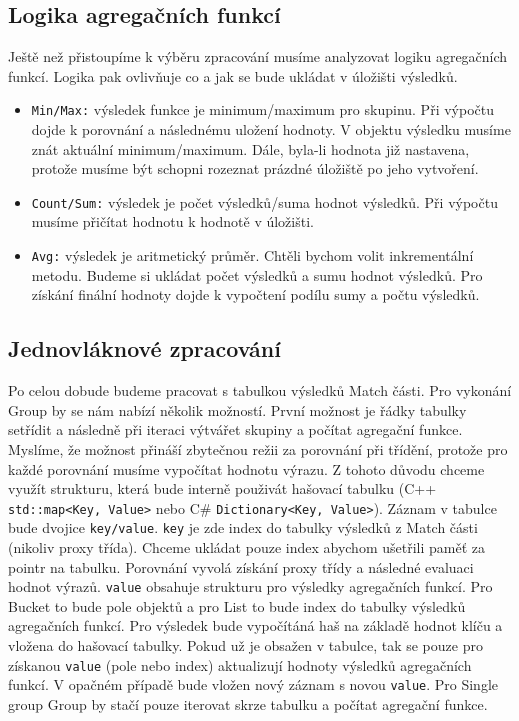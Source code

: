 \subsection{Logika agregačních funkcí}

Ještě než přistoupíme k výběru zpracování musíme analyzovat logiku agregačních funkcí.
Logika pak ovlivňuje co a jak se bude ukládat v úložišti výsledků.

\begin{itemize}
\item \texttt{Min/Max:} výsledek funkce je minimum/maximum pro skupinu. Při výpočtu dojde k porovnání a následnému uložení hodnoty.
V objektu výsledku musíme znát aktuální minimum/maximum.
Dále, byla-li hodnota již nastavena, protože musíme být schopni rozeznat prázdné úložiště po jeho vytvoření.


\item \texttt{Count/Sum:} výsledek je počet výsledků/suma hodnot výsledků. Při výpočtu musíme přičítat hodnotu k hodnotě v úložišti.
\item \texttt{Avg:} výsledek je aritmetický průměr. Chtěli bychom volit inkrementální metodu. Budeme si ukládat počet výsledků a sumu hodnot výsledků. Pro získání finální hodnoty dojde k vypočtení podílu sumy a počtu výsledků.
\end{itemize}

\subsection{Jednovláknové zpracování}

Po celou dobude budeme pracovat s tabulkou výsledků Match části.
Pro vykonání Group by se nám nabízí několik možností.
První možnost je řádky tabulky setřídit a následně při iteraci výtvářet skupiny a počítat agregační funkce.
Myslíme, že možnost přináší zbytečnou režii za porovnání při třídění, protože pro každé porovnání musíme vypočítat hodnotu výrazu.
Z tohoto důvodu chceme využít strukturu, která bude interně použivát hašovací tabulku (C++ \texttt{std::map<Key, Value>} nebo C\#  \texttt{Dictionary<Key, Value>}).
Záznam v tabulce bude dvojice \texttt{key/value}. 
\texttt{key} je zde index do tabulky výsledků z Match části (nikoliv proxy třída).
Chceme ukládat pouze index abychom ušetřili paměť za pointr na tabulku.
Porovnání vyvolá získání proxy třídy a následné evaluaci hodnot výrazů.
\texttt{value} obsahuje strukturu pro výsledky agregačních funkcí.
Pro Bucket to bude pole objektů a pro List to bude index do tabulky výsledků agregačních funkcí.
Pro výsledek bude vypočítáná haš na základě hodnot klíču a vložena do hašovací tabulky.
Pokud už je obsažen v tabulce, tak se pouze pro získanou \texttt{value} (pole nebo index) aktualizují hodnoty výsledků agregačních funkcí.
V opačném případě bude vložen nový záznam s novou \texttt{value}.
Pro Single group Group by stačí pouze iterovat skrze tabulku a počítat agregační funkce.

